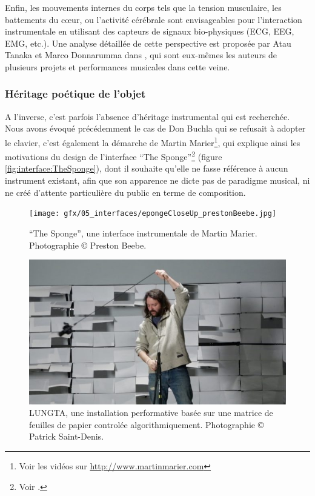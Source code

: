 \indent Enfin, les mouvements internes du corps tels que la tension musculaire, les battements du cœur, ou l'activité cérébrale sont envisageables pour l'interaction instrumentale en utilisant des capteurs de signaux bio-physiques (ECG, EEG, EMG, etc.). Une analyse détaillée de cette perspective est proposée par Atau Tanaka et Marco Donnarumma dans \cite{tanaka_body_2019}, qui sont eux-mêmes les auteurs de plusieurs projets et performances musicales dans cette veine.

\subsubsection{Héritage poétique de l'objet}

\noindent A l'inverse, c'est parfois l'absence d'héritage instrumental qui est recherchée. Nous avons évoqué précédemment le cas de Don Buchla qui se refusait à adopter le clavier, c'est également la démarche de Martin Marier\footnote{Voir les vidéos sur \url{http://www.martinmarier.com}}, qui explique ainsi les motivations du design de l'interface ``The Sponge''\footnote{Voir \cite{marier_sponge_2010}.} (figure \ref{fig:interface:TheSponge}), dont il souhaite qu'elle ne fasse référence à aucun instrument existant, afin que son apparence ne dicte pas de paradigme musical, ni ne créé d'attente particulière du public en terme de composition.\\
\begin{figure}[!htbp]
	\captionsetup{format=plain}%
	\centering
	\begin{minipage}[t]{0.48\textwidth}
		\texttt{[image: gfx/05\_interfaces/epongeCloseUp\_prestonBeebe.jpg]}
		\caption[``The Sponge'' de Martin Marier]{``The Sponge'', une interface instrumentale de Martin Marier. Photographie © Preston Beebe.}
		\label{fig:interface:TheSponge}
	\end{minipage}
	\hspace{.02\linewidth}
	\begin{minipage}[t]{0.48\textwidth}
	    \includegraphics[width=\linewidth]{gfx/05_interfaces/Saint-Denis-Lungta.jpg}
		\caption[LUNGTA de Patrick Saint-Denis]{LUNGTA, une installation performative basée sur une matrice de feuilles de papier controlée algorithmiquement. Photographie © Patrick Saint-Denis.}
		\label{fig:interface:lungta}
	\end{minipage}
\end{figure}
